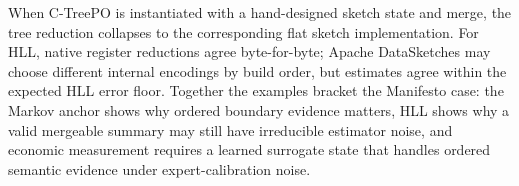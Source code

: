 When C-TreePO is instantiated with a hand-designed sketch state and merge, the
tree reduction collapses to the corresponding flat sketch implementation. For
HLL, native register reductions agree byte-for-byte; Apache DataSketches may
choose different internal encodings by build order, but estimates agree within
the expected HLL error floor. Together the examples bracket the Manifesto case:
the Markov anchor shows why ordered boundary evidence matters, HLL shows why a
valid mergeable summary may still have irreducible estimator noise, and
economic measurement requires a learned surrogate state that handles ordered
semantic evidence under expert-calibration noise.
